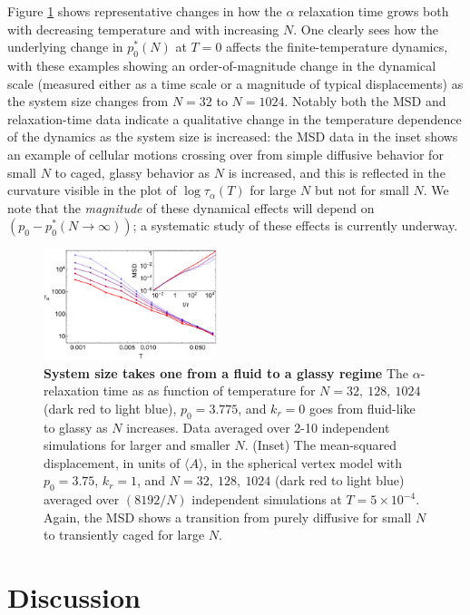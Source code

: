 \documentclass[aps,pre,reprint,superscriptaddress,nofootinbib]{revtex4-2}
\begin{document}
Figure \ref{fig:msd} shows representative changes in how the $\alpha$ relaxation time grows both with decreasing temperature and with increasing $N$. One clearly sees how the underlying change in $p_0^*(N)$ at $T=0$ affects the finite-temperature dynamics, with these examples showing an order-of-magnitude change in the dynamical scale (measured either as a time scale or a magnitude of typical displacements) as the system size changes from $N=32$ to $N=1024$. Notably both the MSD and relaxation-time data indicate a qualitative change in the temperature dependence of the dynamics as the system size is increased: the MSD data in the inset shows an example of cellular motions crossing over from simple diffusive behavior for small $N$ to caged, glassy behavior as $N$ is increased, and this is reflected in the curvature visible in the plot of  $\log \tau_\alpha(T)$ for large $N$ but not for small $N$. We note that the \emph{magnitude} of these dynamical effects will depend on $\left(p_0-p_0^*(N\rightarrow\infty)\right)$; a systematic study of these effects is currently underway.


\begin{figure}[b]
\centerline{
\includegraphics[width=0.45\textwidth]{newFig3.pdf}
}
\caption{\label{fig:msd}
{\bf{System size takes one from a fluid to a glassy regime}} The $\alpha$-relaxation time as as function of temperature for $N=32,\ 128,\ 1024$ (dark red to light blue), $p_0=3.775$, and $k_r=0$ goes from fluid-like to glassy as $N$ increases. Data averaged over 2-10 independent simulations for larger and smaller $N$. (Inset)  The mean-squared displacement, in units of $\langle A \rangle$, in the spherical vertex model with $p_0=3.75$, $k_r=1$, and $N=32,\ 128,\ 1024$ (dark red to light blue) averaged over $(8192/N)$ independent simulations at $T=5\times 10^{-4}$. Again, the MSD shows a transition from purely diffusive for small $N$ to transiently caged for large $N$.}
\end{figure}


\section{Discussion}
\end{document}
